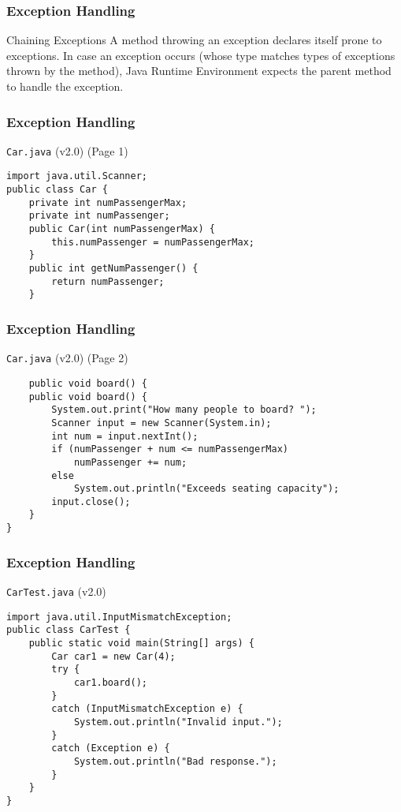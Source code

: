 \documentclass[10pt, compress]{beamer}
\begin{document}
\begin{frame}[fragile]
	\frametitle{Exception Handling}
	\begin{block}{Chaining Exceptions}
		A method throwing an exception declares itself prone to exceptions. In case an exception occurs (whose type matches types of exceptions thrown by the method), Java Runtime Environment expects the parent method to handle the exception.
	\end{block}
\end{frame}

\begin{frame}[fragile]
	\frametitle{Exception Handling}
	\begin{block}{\texttt{Car.java} (v2.0) (Page 1)}
		\begin{verbatim}
import java.util.Scanner;
public class Car {
	private int numPassengerMax;
	private int numPassenger;
	public Car(int numPassengerMax) {
		this.numPassenger = numPassengerMax;
	}
	public int getNumPassenger() {
		return numPassenger;
	}
		\end{verbatim}
	\end{block}
\end{frame}

\begin{frame}[fragile]
	\frametitle{Exception Handling}
	\begin{block}{\texttt{Car.java} (v2.0) (Page 2)}
		\begin{verbatim}
	public void board() {
	public void board() {
		System.out.print("How many people to board? ");
		Scanner input = new Scanner(System.in);
		int num = input.nextInt();
		if (numPassenger + num <= numPassengerMax)
			numPassenger += num;
		else
			System.out.println("Exceeds seating capacity");
		input.close();
	}
}
		\end{verbatim}
	\end{block}
\end{frame}

\begin{frame}[fragile]
	\frametitle{Exception Handling}
	\begin{block}{\texttt{CarTest.java} (v2.0)}
		\begin{verbatim}
import java.util.InputMismatchException;
public class CarTest {
	public static void main(String[] args) {
		Car car1 = new Car(4);
		try {
			car1.board();
		}
		catch (InputMismatchException e) {
			System.out.println("Invalid input.");
		}
		catch (Exception e) {
			System.out.println("Bad response.");
		}
	}
}
		\end{verbatim}
	\end{block}
\end{frame}
\end{document}
